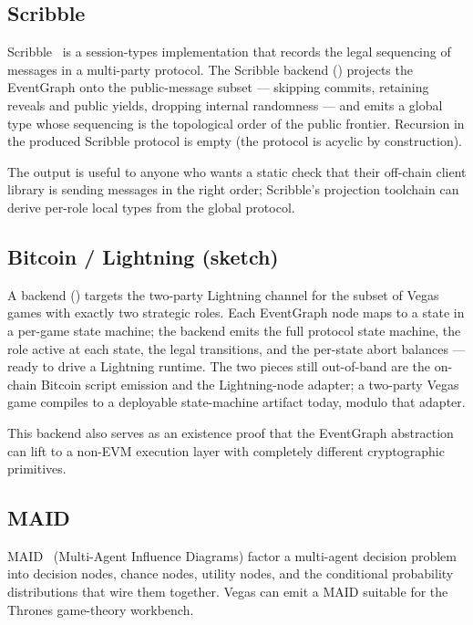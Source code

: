 \subsection{Scribble}

Scribble~\citep{HondaYoshidaCarbone2008MPST} is a session-types
implementation that records the legal sequencing of messages in a
multi-party protocol.  The Scribble backend
() projects the EventGraph onto the
public-message subset --- skipping commits, retaining reveals and
public yields, dropping internal randomness --- and emits a global
type whose sequencing is the topological order of the public
frontier.  Recursion in the produced Scribble protocol is empty
(the protocol is acyclic by construction).

The output is useful to anyone who wants a static check that
their off-chain client library is sending messages in the right
order; Scribble's projection toolchain can derive per-role local
types from the global protocol.

\subsection{Bitcoin / Lightning (sketch)}

A backend () targets the two-party
Lightning channel for the subset of Vegas games with exactly
two strategic roles.  Each EventGraph node maps to a state in a
per-game state machine; the backend emits the full protocol
state machine, the role active at each state, the legal
transitions, and the per-state abort balances --- ready to drive
a Lightning runtime.  The two pieces still out-of-band are the
on-chain Bitcoin script emission and the Lightning-node
adapter; a two-party Vegas game compiles to a deployable
state-machine artifact today, modulo that adapter.

This backend also serves as an existence proof that the
EventGraph abstraction can lift to a non-EVM execution layer
with completely different cryptographic primitives.

\subsection{MAID}

MAID~\citep{koller2003multi} (Multi-Agent Influence Diagrams)
factor a multi-agent decision problem into decision nodes,
chance nodes, utility nodes, and the conditional probability
distributions that wire them together.  Vegas can emit a MAID
suitable for the Thrones game-theory workbench.

